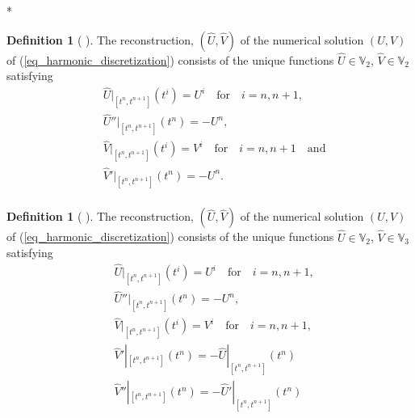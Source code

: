 \documentclass[12pt,a4paper]{article}
\numberwithin{equation}{section}
\theoremstyle{definition}
\newcommand{\qp}[1]{\left(#1\right)}
\newcommand{\qb}[1]{\left[#1\right]}
\newcommand{\rec}[1]{\widehat{{#1}}}
\newtheorem{Defn}[subsection]{Definition}
\begin{document}
 \/*
\begin{Defn}[ ]\label{defn_our_rec}
	The reconstruction, $\qp{\rec{U},\rec{V}}$ of the numerical solution $\qp{U,V}$ of (\ref{eq_harmonic_discretization}) consists of the unique functions $\rec{U}\in \mathbb{V}_2$, $\rec{V}\in\mathbb{V}_2$ satisfying
	\begin{equation}
	\begin{aligned}
	&\rec{U}|_{\qb{t^n,t^{n+1}}}\qp{t^i}=U^i \quad \text{for}\quad i= n, n+1,\\
	&\rec{U}''|_{\qb{t^n,t^{n+1}}}\qp{t^n}=-U^n,\\
	&	\rec{V}|_{\qb{t^n,t^{n+1}}}\qp{t^{i}}=V^{i}\quad \text{for}\quad i= n, n+1\quad\text{and}\\
	&	\rec{V}'|_{\qb{t^n,t^{n+1}}}\qp{t^n}=-U^n.\\
	\end{aligned}
	\end{equation}
\end{Defn}
\begin{Defn}[ ]\label{defn_our_rec2}
	The reconstruction, $\qp{\rec{U},\rec{V}}$ of the numerical solution $\qp{U,V}$ of (\ref{eq_harmonic_discretization}) consists of the unique functions $\rec{U}\in \mathbb{V}_2$, $\rec{V}\in\mathbb{V}_3$ satisfying
	\begin{equation}\label{eq_rec2_conds}
	\begin{aligned}
	&\rec{U}|_{\qb{t^n,t^{n+1}}}\qp{t^i}=U^i \quad \text{for}\quad i= n, n+1,\\
	&\rec{U}''|_{\qb{t^n,t^{n+1}}}\qp{t^n}=-U^n,\\
     &\rec{V}|_{\qb{t^n,t^{n+1}}}\qp{t^i}=V^i \quad \text{for}\quad i= n, n+1,\\
      &\rec{V}'|_{\qb{t^n,t^{n+1}}}\qp{t^n}=-\rec{U}|_{\qb{t^n,t^{n+1}}}\qp{t^n}\\
            &\rec{V}''|_{\qb{t^n,t^{n+1}}}\qp{t^n}=-\rec{U}'|_{\qb{t^n,t^{n+1}}}\qp{t^n}\\
	\end{aligned}
	\end{equation}
\end{Defn}
\end{document}
